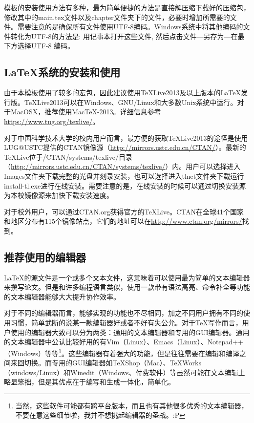 模板的安装使用方法有多种，最为简单便捷的方法是直接解压缩下载好的压缩包，修改其中的main.tex文件以及chapter文件夹下的文件，必要时增加所需要的文件。需要注意的是确保所有文件使用UTF-8编码。Windows系统中将其他编码的文件转化为UTF-8的方法是: 用记事本打开这些文件, 然后点击文件—另存为—在最下方选择UTF-8 编码。

\subsection{\texorpdfstring{\LaTeX}{LaTeX}系统的安装和使用}
由于本模板使用了较多的宏包，因此建议使用TeXLive2013及以上版本的\LaTeX 发行版。TeXLive2013可以在Windows、GNU/Linux和大多数Unix系统中运行。对于MacOSX，推荐使用MacTeX-2013。详细信息参考\url{https://www.tug.org/texlive/}。

对于中国科学技术大学的校内用户而言，最方便的获取TeXLive2013的途径是使用LUG@USTC提供的CTAN镜像源（\url{http://mirrors.ustc.edu.cn/CTAN/}）。最新的TeXLive位于/CTAN/systems/texlive/目录（\url{http://mirrors.ustc.edu.cn/CTAN/systems/texlive/}）内。用户可以选择进入Images文件夹下载完整的光盘并刻录安装，也可以选择进入tlnet文件夹下载运行install-tl.exe进行在线安装。需要注意的是，在线安装的时候可以通过切换安装源为本校镜像源来加快下载安装速度。

对于校外用户，可以通过CTAN.org获得官方的TeXLive。CTAN在全球41个国家和地区分布有115个镜像站点，它们的地址可以在\url{http://www.ctan.org/mirrors/}找到。

\subsection{推荐使用的编辑器}
\LaTeX 的源文件是一个或多个文本文件，这意味着可以使用最为简单的文本编辑器来撰写论文。但是和许多编程语言类似，使用一款带有语法高亮、命令补全等功能的文本编辑器能够大大提升协作效率。

对于不同的编辑器而言，能够实现的功能也不尽相同，加之不同用户拥有不同的使用习惯，简单武断的说某一款编辑器好或者不好有失公允。对于\TeX 写作而言，用户使用的编辑器大致可以分为两类：通用的文本编辑器和专用的GUI编辑器。通用的文本编辑器中公认比较好用的有Vim（Linux）、Emacs（Linux）、Notepad++（Windows）等等\footnote{当然，这些软件可能都有跨平台版本，而且也有其他很多优秀的文本编辑器，不要在意这些细节啦，我并不想挑起编辑器的圣战。:P}。这些编辑器有着强大的功能，但是往往需要在编辑和编译之间来回切换。而专用的GUI编辑器如TeXShop（Mac）、TeXWorks（windows/Linux）和Winedit（Windows、付费软件）等虽然可能在文本编辑上略显笨拙，但是其优点在于编写和生成一体化，简单化。

